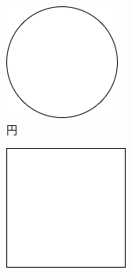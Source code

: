 \begin{figure}[H]
    \centering
    \begin{subfigure}[b]{0.2\textwidth}
        \centering\includegraphics[width=\textwidth]{figures/circle.drawio.png}
        \caption{円}
        \label{fig:circle}
    \end{subfigure}
    \hfill
    \begin{subfigure}[b]{0.2\textwidth}
        \centering\includegraphics[width=\textwidth]{figures/square.drawio.png}

\end{subfigure}
\end{figure}
